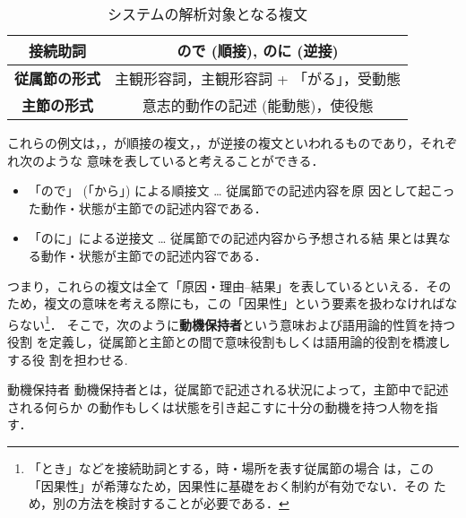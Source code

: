 \begin{table}[htbp]
\caption{システムの解析対象となる複文}
\begin{center}
\begin{tabular}{|c||c|} \hline
        {\bf 接続助詞} & ので (順接), のに (逆接) \\ \hline
        {\bf 従属節の形式} & 主観形容詞，主観形容詞 + 「がる」，受動態 
\\ \hline
        {\bf 主節の形式} & 意志的動作の記述 (能動態)，使役態 \\ \hline
\end{tabular}
\end{center}
\end{table}


これらの例文は，，が順接の複文，，が逆接の複文といわれるものであり，それぞれ次のような
意味を表していると考えることができる．

\begin{itemize}
        \item 「ので」 (「から」) による順接文 … 従属節での記述内容を原
因として起こった動作・状態が主節での記述内容である．
        \item 「のに」による逆接文 … 従属節での記述内容から予想される結
果とは異なる動作・状態が主節での記述内容である．
\end{itemize}
つまり，これらの複文は全て「原因・理由--結果」を表しているといえる．その
ため，複文の意味を考える際にも，この「因果性」という要素を扱わなければな
らない\footnote{「とき」などを接続助詞とする，時・場所を表す従属節の場合
は，この「因果性」が希薄なため，因果性に基礎をおく制約が有効でない．その
ため，別の方法を検討することが必要である．}．
そこで，次のように{\bf 動機保持者}という意味および語用論的性質を持つ役割
を定義し，従属節と主節との間で意味役割もしくは語用論的役割を橋渡しする役
割を担わせる.

\begin{definit}{動機保持者} 
動機保持者とは，従属節で記述される状況によって，主節中で記述される何らか
の動作もしくは状態を引き起こすに十分の動機を持つ人物を指す．
\end{definit}

